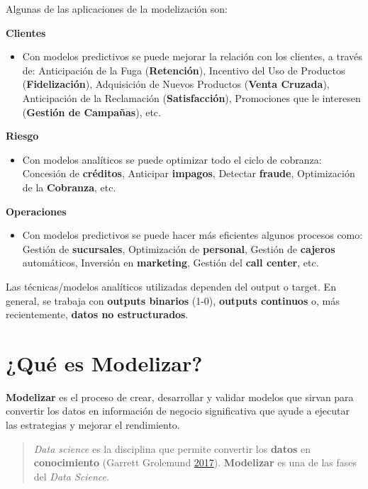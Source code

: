 \documentclass[]{book}
\providecommand{\tightlist}{%
  \setlength{\itemsep}{0pt}\setlength{\parskip}{0pt}}
\begin{document}
Algunas de las aplicaciones de la modelización son:

\textbf{Clientes}

\begin{itemize}
\tightlist
\item
  Con modelos predictivos se puede mejorar la relación con los clientes, a través de: Anticipación de la Fuga (\textbf{Retención}), Incentivo del Uso de Productos (\textbf{Fidelización}), Adquisición de Nuevos Productos (\textbf{Venta Cruzada}), Anticipación de la Reclamación (\textbf{Satisfacción}), Promociones que le interesen (\textbf{Gestión de Campañas}), etc.
\end{itemize}

\textbf{Riesgo}

\begin{itemize}
\tightlist
\item
  Con modelos analíticos se puede optimizar todo el ciclo de cobranza: Concesión de \textbf{créditos}, Anticipar \textbf{impagos}, Detectar \textbf{fraude}, Optimización de la \textbf{Cobranza}, etc.
\end{itemize}

\textbf{Operaciones}

\begin{itemize}
\tightlist
\item
  Con modelos predictivos se puede hacer más eficientes algunos procesos como: Gestión de \textbf{sucursales}, Optimización de \textbf{personal}, Gestión de \textbf{cajeros} automáticos, Inversión en \textbf{marketing}, Gestión del \textbf{call center}, etc.
\end{itemize}

Las técnicas/modelos analíticos utilizadas dependen del output o target. En general, se trabaja con \textbf{outputs binarios} (1-0), \textbf{outputs continuos} o, más recientemente, \textbf{datos no estructurados}.

\hypertarget{modelizar}{%
\section{¿Qué es Modelizar?}\label{modelizar}}

\textbf{Modelizar} es el proceso de crear, desarrollar y validar modelos que sirvan para convertir los datos en información de negocio significativa que ayude a ejecutar las estrategias y mejorar el rendimiento.

\begin{quote}
\emph{Data science} es la disciplina que permite convertir los \textbf{datos} en \textbf{conocimiento} (Garrett Grolemund \protect\hyperlink{ref-rdc2017}{2017}). \textbf{Modelizar} es una de las fases del \emph{Data Science}.
\end{quote}
\end{document}
